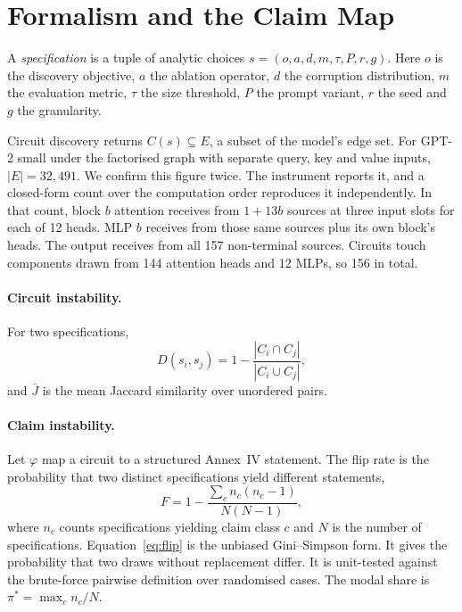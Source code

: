 \documentclass[letterpaper]{article} %
\begin{document}
\section{Formalism and the Claim Map}

A \emph{specification} is a tuple of analytic choices
$s = (o, a, d, m, \tau, P, r, g)$. Here $o$ is the discovery objective, $a$ the
ablation operator, $d$ the corruption distribution, $m$ the evaluation metric,
$\tau$ the size threshold, $P$ the prompt variant, $r$ the seed and $g$ the
granularity.

Circuit discovery returns $C(s) \subseteq E$, a subset of the model's edge set.
For GPT-2 small under the factorised graph with separate query, key and value
inputs, $|E| = 32{,}491$. We confirm this figure twice. The instrument reports
it, and a closed-form count over the computation order reproduces it
independently. In that count, block $b$ attention receives from $1 + 13b$ sources
at three input slots for each of 12 heads. MLP $b$ receives from those same
sources plus its own block's heads. The output receives from all 157
non-terminal sources. Circuits touch components drawn from 144 attention heads
and 12 MLPs, so 156 in total.

\paragraph{Circuit instability.}
For two specifications,
\begin{equation}
D(s_i, s_j) = 1 - \frac{|C_i \cap C_j|}{|C_i \cup C_j|},
\end{equation}
and $\bar{J}$ is the mean Jaccard similarity over unordered pairs.

\paragraph{Claim instability.}
Let $\varphi$ map a circuit to a structured Annex~IV statement. The flip rate is
the probability that two distinct specifications yield different statements,
\begin{equation}
F = 1 - \frac{\sum_c n_c (n_c - 1)}{N(N-1)},
\label{eq:flip}
\end{equation}
where $n_c$ counts specifications yielding claim class $c$ and $N$ is the number
of specifications. Equation~\ref{eq:flip} is the unbiased Gini--Simpson form. It
gives the probability that two draws without replacement differ. It is
unit-tested against the brute-force pairwise definition over randomised cases.
The modal share is $\pi^{*} = \max_c n_c / N$.
\end{document}
